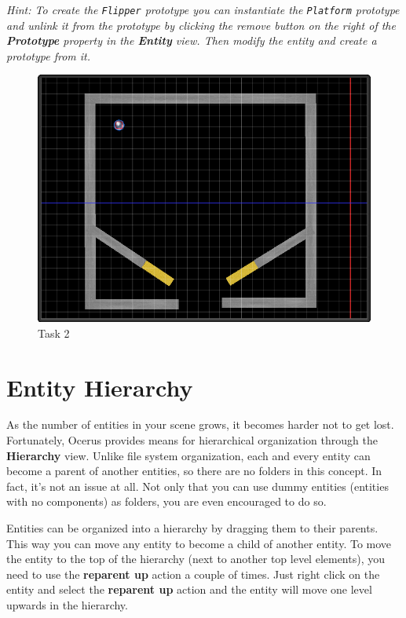 \documentclass[a4paper,12pt]{article}
\begin{document}
\textit{Hint: To create the \texttt{Flipper} prototype you can instantiate the \texttt{Platform} prototype and unlink it from the prototype by clicking the remove button on the right of the \textbf{Prototype} property in the \textbf{Entity} view. Then modify the entity and create a prototype from it.}

\begin{figure}[ht]
 \begin{center}
  \includegraphics[scale=0.65]{Task2}
 \end{center}
 \caption{Task 2}
 \label{fig:task_2}
\end{figure}

\section{Entity Hierarchy}
As the number of entities in your scene grows, it becomes harder not to get lost. Fortunately, Ocerus provides means for hierarchical organization through the \textbf{Hierarchy} view. Unlike file system organization, each and every entity can become a parent of another entities, so there are no folders in this concept. In fact, it's not an issue at all. Not only that you can use dummy entities (entities with no components) as folders, you are even encouraged to do so.

Entities can be organized into a hierarchy by dragging them to their parents. This way you can move any entity to become a child of another entity. To move the entity to the top of the hierarchy (next to another top level elements), you need to use the \textbf{reparent up} action a couple of times. Just right click on the entity and select the \textbf{reparent up} action and the entity will move one level upwards in the hierarchy.
\end{document}
